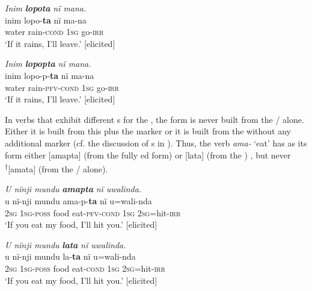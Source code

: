   \ea%
    \label{ex:verbs:89}
          \textit{Inim} \textbf{\textit{lopota}} \textit{nï mana.}\\
\gll    inim      lopo-\textbf{ta}      nï    ma-na\\
    water    rain-\textsc{cond}  \textsc{1sg}  go-\textsc{irr}\\
\glt `If it rains, I’ll leave.’ [elicited]
\z

  \ea%
    \label{ex:verbs:90}
          \textit{Inim} \textbf{\textit{lopopta}} \textit{nï mana.}\\
\gll    inim      lopo-p-\textbf{ta}      nï    ma-na\\
    water    rain-\textsc{pfv-cond}  \textsc{1sg}  go-\textsc{irr}\\
\glt `If it rains, I’ll leave.’ [elicited]
\z

  In verbs that exhibit different s for the  , the  form is never built from the /  alone. Either it is built from this   plus the  marker or it is built from the    without any additional marker (cf. the discussion of s in ). Thus, the verb \textit{ama-} ‘eat’ has as its  form either [amapta] (from the fully ed  form)  or [lata] (from the  ) , but never \textsuperscript{†}[amata] (from the /  alone).
  
\ea%
    \label{ex:verbs:90a}
          \textit{U nïnji mundu} \textbf{\textit{amapta}} \textit{nï uwalinda.}\\
\gll    u  nï-nji  mundu  ama-p-\textbf{ta}      nï  u=wali-nda\\
    2\textsc{sg}  1\textsc{sg-poss} food eat-\textsc{pfv-cond}  1\textsc{sg}  2\textsc{sg}=hit-\textsc{irr}\\
\glt `If you eat my food, I’ll hit you.’ [elicited]
\z

\ea%
    \label{ex:verbs:90b}
          \textit{U nïnji mundu} \textbf{\textit{lata}} \textit{nï uwalinda.}\\
\gll    u  nï-nji  mundu  la-\textbf{ta}      nï  u=wali-nda\\
    2\textsc{sg}  1\textsc{sg-poss} food eat-\textsc{cond}  1\textsc{sg}  2\textsc{sg}=hit-\textsc{irr}\\
\glt `If you eat my food, I’ll hit you.’ [elicited]
\z

